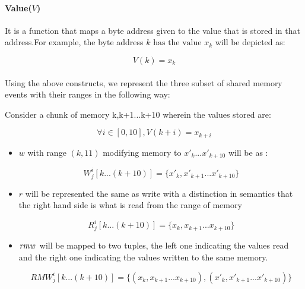             
         \paragraph{Value($V$)}  
           It is a function that maps a byte address given to the value that is stored in that address.For example, the byte address $k \text{ has the value } x_k$ will be depicted as:
                
                \[V(k) = x_k\]
            
            
         \paragraph{}
            Using the above constructs, we represent the three subset of shared memory events with their ranges in the following way:
            
            Consider a chunk of memory {k,k+1...k+10} wherein the values stored are:
            
                \[\forall i \in [0,10], V(k+i) = x_{k+i}\]
                
            \begin{itemize}
                \item $w$ with range $(k,11)$ modifying memory to ${x'_{k}}...{x'_{k+10}}$ will be as : 
                
                        \[{W^i_j}[k...(k+10)] = \{x'_{k}, x'_{k+1}...x'_{k + 10}\}\]
                
                \item $r$ will be represented the same as write with a distinction in semantics that the right hand side is what is read from the range of memory 
                
                        \[{R^i_j}[k...(k+10)] = \{x_{k}, x_{k+1}...x_{k + 10}\}\]
                
                \item $\textit{rmw}\,$ will be mapped to two tuples, the left one indicating the values read and the right one indicating the values written to the same memory. 
                
                        \[{RMW^i_j}[k...(k+10)] = \{(x_{k}, x_{k+1}...x_{k + 10}), (x{'}_{k}, x{'}_{k+1}...x{'}_{k + 10}) \}\]
                
            \end{itemize}
            

